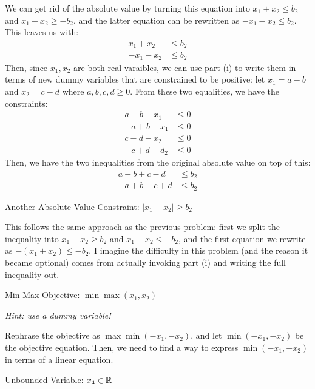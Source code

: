 \documentclass[11pt]{article}
\begin{document}
\begin{subparts}
	\begin{solution}
		We can get rid of the absolute value by turning this equation into \(x_1 + x_2 \le  b_2\) and 
		\(x_1 + x_2 \ge  -b_2\), and the latter equation can be rewritten as \(-x_1 - x_2 \le  b_2\). This 
		leaves us with:
		\begin{align*}
			x_1 + x_2 &\le  b_2\\
			-x_1 - x_2 &\le  b_2
		\end{align*}
		Then, since \(x_1, x_2 \) are both real varaibles, we can use part (i) to write them 
		in terms of new dummy variables that are constrained to be positive: let \(x_1 = a -b\) and 
		\(x_2 = c - d\) where \(a, b, c, d \ge  0\). From these two equalities, we have the constraints:
		\begin{align*}
			a - b - x_1 &\le 0\\
			-a + b + x_1 & \le 0\\
			c - d - x_2 &\le 0\\
			-c + d + d_2 &\le 0
		\end{align*}
		Then, we have the two inequalities from the original absolute value on top of this:
		\begin{align*}
			a - b + c - d & \le b_2\\
			-a + b - c + d& \le  b_2
		\end{align*}
	\end{solution}
    \subpart Another Absolute Value Constraint: $|x_1 + x_2| \geq b_2$

	\begin{solution}
		This follows the same approach as the previous problem: first we split the inequality into 
		\(x_1 + x_2 \ge  b_2\) and \(x_1 + x_2 \le -b_2\), and the first equation we rewrite as 
		\(-(x_1 + x_2) \le  -b_2\). I imagine the difficulty in this problem (and the reason 
		it became optional) comes from actually invoking 
		part (i) and writing the full inequality out. 
	\end{solution}
  \subpart Min Max Objective: $\min \max (x_1,x_2)$

  \emph{Hint: use a dummy variable!}

  \begin{solution}
  	Rephrase the objective as \(\max \min (-x_1, -x_2)\), and let \(\min(-x_1, -x_2)\) be the objective 
	equation. Then, we need to find a way to express \(\min(-x_1, -x_2)\) in terms of a linear equation.  
  \end{solution}


  \subpart Unbounded Variable: $x_4 \in \mathbb{R}$


\end{subparts}
\end{document}
